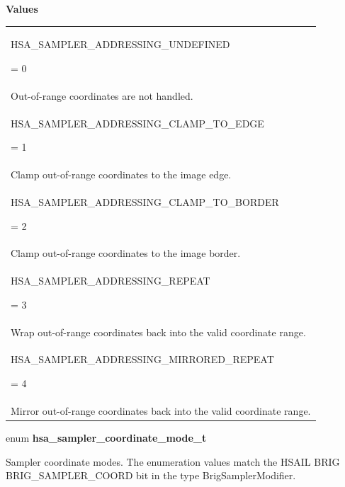 \documentclass[final]{book}
\newcommand{\reftyp}[1]{#1}
\newcommand{\refenu}[1]{\reftyp{#1}}
\begin{document}
\begin{appendices}
\noindent\textbf{Values}\\[-5mm]
\begin{longtable}{@{\hspace{2em}}p{\linewidth-2em}}
\hspace{-2em}\hypertarget{group--images-1ggaaf2a640a112084fae3985158fbfd2584ad55f29d298b0675e6e1eeaa8c17d1902}{\refenu{HSA_SAMPLER_ADDRESSING_UNDEFINED}} = 0\\Out-of-range coordinates are not handled.\\[2mm]
\hspace{-2em}\hypertarget{group--images-1ggaaf2a640a112084fae3985158fbfd2584a3aa209173883371af8b0312cb1d13f91}{\refenu{HSA_SAMPLER_ADDRESSING_CLAMP_TO_EDGE}} = 1\\Clamp out-of-range coordinates to the image edge.\\[2mm]
\hspace{-2em}\hypertarget{group--images-1ggaaf2a640a112084fae3985158fbfd2584abed783b1cf4dd1f2f65d53f56b02d75b}{\refenu{HSA_SAMPLER_ADDRESSING_CLAMP_TO_BORDER}} = 2\\Clamp out-of-range coordinates to the image border.\\[2mm]
\hspace{-2em}\hypertarget{group--images-1ggaaf2a640a112084fae3985158fbfd2584afc3bda793b826cd35d159cb15fd3baea}{\refenu{HSA_SAMPLER_ADDRESSING_REPEAT}} = 3\\Wrap out-of-range coordinates back into the valid coordinate range.\\[2mm]
\hspace{-2em}\hypertarget{group--images-1ggaaf2a640a112084fae3985158fbfd2584a8d8799defa0a327a2d1e33e1b61c0f8c}{\refenu{HSA_SAMPLER_ADDRESSING_MIRRORED_REPEAT}} = 4\\Mirror out-of-range coordinates back into the valid coordinate range.
\end{longtable}

\noindent\begin{tcolorbox}[nobeforeafter,arc=0mm,colframe=white,colback=lightgray,left=0mm]
enum \hypertarget{group--images-1ga758676bca930b57be2f532ebc22b3f6f}{\textbf{hsa_sampler_coordinate_mode_t}}
\end{tcolorbox}
Sampler coordinate modes. The enumeration values match the HSAIL BRIG BRIG_SAMPLER_COORD bit in the type BrigSamplerModifier.


\end{appendices}
\end{document}
